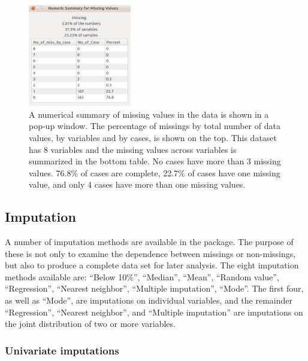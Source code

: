 \documentclass[article]{jss}
\begin{document}
\begin{center}
\begin{figure}[h]
\begin{centering}
\includegraphics[width=0.4\textwidth]{fig2}
\par\end{centering}
\caption{A numerical summary of missing values in the data is shown in a pop-up window.  The percentage of missings by total number of data values, by variables and by cases, is shown on the top. This dataset has 8 variables and the missing values across variables is summarized in the bottom table. No cases have more than 3 missing values.  76.8\% of cases are complete, 22.7\% of cases have one missing value, and only 4 cases have more than one missing values.}
\label{fig: num-summry}
\end{figure}
\par\end{center}

\subsection{Imputation}

A number of imputation methods are available in the package. The purpose of these is not only to examine the dependence between missings or non-missings, but also to produce a complete data set for later analysis.  The eight imputation methods available are: 
``Below 10\%'', ``Median'', ``Mean'', 
``Random value'', ``Regression'', ``Nearest neighbor'', 
``Multiple imputation'', ``Mode''. 
The first four, as well as ``Mode'', are imputations on individual variables, and the remainder  ``Regression'', ``Nearest neighbor'', and ``Multiple imputation'' are imputations on the joint distribution of two or more  variables.

\subsubsection{Univariate imputations}
\end{document}
